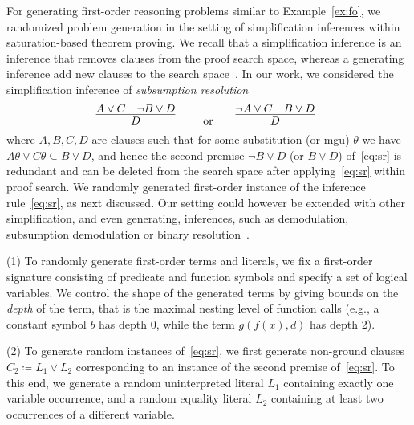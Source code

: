 For generating first-order reasoning problems similar to
Example~\ref{ex:fo}, we randomized problem generation in the setting
of simplification inferences within saturation-based theorem
proving. We recall that a simplification inference is an inference
that removes clauses from the proof search space, whereas a generating
inference add new clauses to the search space~\cite{Vampire13}. In our work, we
considered the simplification inference of 
\emph{subsumption resolution} 
\begin{equation}\label{eq:sr}
    \infer[]{
      D
      }{
      A\vee C
      &
      {\neg B \vee D}
    }
    \qquad \text{or}\qquad
    \infer[]{
      D
      }{
      \neg A\vee C
      &
      {B \vee D}
    }
      \end{equation}
      where $A,B,C,D$ are clauses
      such that for some substitution (or mgu) $\theta$ we have $A\theta\vee
C\theta\subseteq B\vee D$, and hence the second premise $\neg B \vee
D$ (or $B \vee
D$) of~\eqref{eq:sr} is redundant and can  be deleted from the search
space after applying~\eqref{eq:sr} within proof search.
%
We randomly generated first-order instance of the inference rule~\eqref{eq:sr}, as next
discussed. Our setting could however be extended with other
simplification, and even generating, inferences, such as demodulation,
subsumption demodulation or binary resolution~\cite{Ganzinger01,Rath20}.\smallskip

\noindent (1) To randomly generate first-order terms and literals,
we fix  a first-order signature consisting of %
predicate and function symbols and specify a set of logical
variables. 
We control the shape of the generated terms
by giving bounds on the \emph{depth} of the term,
that is the maximal nesting level of function calls
(e.g., a constant symbol $b$ has depth 0, while the term $g(f(x),d)$ has depth 2).\smallskip


\noindent (2)  To generate random instances of~\eqref{eq:sr}, 
we first generate non-ground clauses $C_2 \coloneqq L_1 \lor L_2$
corresponding to an instance of the second premise of~\eqref{eq:sr}. 
To this end, we generate a random uninterpreted literal $L_1$ containing exactly one variable occurrence,
and a random equality literal $L_2$ containing at least two occurrences of a different variable.\smallskip

